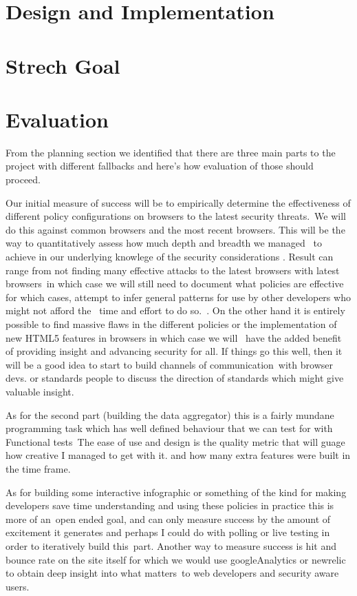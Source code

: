 \documentclass[a4paper,12pt]{paper}
\begin{document}
\section{Design and Implementation}


\section{Strech Goal}

\section{Evaluation}

From the planning section we identified that there are three main parts to the project with different fallbacks and here's how evaluation of those should proceed.\

Our initial measure of success will be to empirically determine the effectiveness of different policy configurations on browsers to the latest security threats.\
We will do this against common browsers and the most recent browsers. This will be the way to quantitatively assess how much depth and breadth we managed \
to achieve in our underlying knowlege of the security considerations . Result can range from not finding many effective attacks to the latest browsers with latest browsers\
in which case we will still need to document what policies are effective for which cases, attempt to infer general patterns for use by other developers who might not afford the \
time and effort to do so.\ .
On the other hand it is entirely possible to find massive flaws in the different policies or the implementation of new HTML5 features in browsers in which case we will \
have the added benefit of providing insight and advancing security for all. If things go this well, then it will be a good idea to start to build channels of communication\
with browser devs. or standards people to discuss the direction of standards which might give valuable insight.\

As for the second part (building the data aggregator) this is a fairly mundane programming task which has well defined behaviour that we can test for with Functional tests\
The ease of use and design is the quality metric that will guage how creative I managed to get with it. and how many extra features were built in the time frame.\

As for building some interactive infographic or something of the kind for making developers save time understanding and using these policies in practice this is more of an\
open ended goal, and can only measure success by the amount of excitement it generates and perhaps I could do with polling or live testing in order to iteratively build this\
part. Another way to measure success is hit and bounce rate on the site itself for which we would use googleAnalytics or newrelic to obtain deep insight into what matters\
to web developers and security aware users.\
\end{document}
